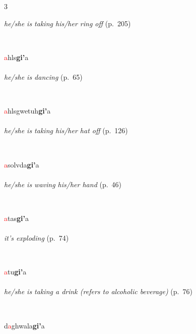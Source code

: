 \documentclass[oneside,openany]{book}%
\begin{document}
\begin{multicols}{3}
\begin{minipage}[t]{\linewidth}
\noindent \textit{he/she is taking his/her ring off} (p.~205)
\end{minipage}\\[1em]%
\begin{minipage}[t]{\linewidth}
\raggedright\noindent \textcolor{Red}{a}hls\textbf{gi'}a\\
\\
\noindent \textit{he/she is dancing} (p.~65)
\end{minipage}\\[1em]%
\begin{minipage}[t]{\linewidth}
\raggedright\noindent \textcolor{Red}{a}hlsgwetuh\textbf{gi'}a\\
\\
\noindent \textit{he/she is taking his/her hat off} (p.~126)
\end{minipage}\\[1em]%
\begin{minipage}[t]{\linewidth}
\raggedright\noindent \textcolor{Red}{a}solvda\textbf{gi'}a\\
\\
\noindent \textit{he/she is waving his/her hand} (p.~46)
\end{minipage}\\[1em]%
\begin{minipage}[t]{\linewidth}
\raggedright\noindent \textcolor{Red}{a}tas\textbf{gi'}a\\
\\
\noindent \textit{it's exploding} (p.~74)
\end{minipage}\\[1em]%
\begin{minipage}[t]{\linewidth}
\raggedright\noindent \textcolor{Red}{a}tu\textbf{gi'}a\\
\\
\noindent \textit{he/she is taking a drink (refers to alcoholic beverage)} (p.~76)
\end{minipage}\\[1em]%
\begin{minipage}[t]{\linewidth}
\raggedright\noindent d\textcolor{Red}{a}ghwala\textbf{gi'}a\\

\end{minipage}
\end{multicols}
\end{document}
